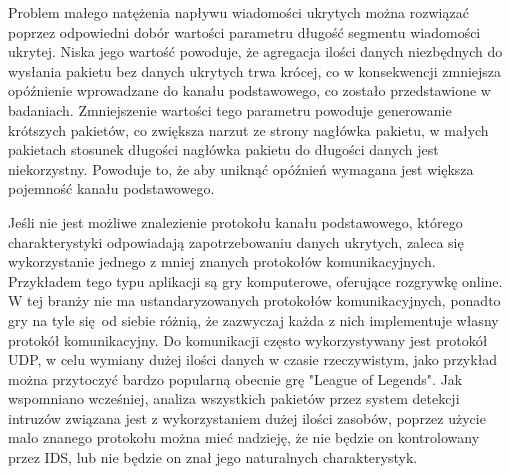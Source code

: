 \documentclass[a4paper, twoside, 12pt]{report}
\begin{document}
       Problem małego natężenia napływu wiadomości ukrytych można rozwiązać poprzez
       odpowiedni dobór wartości parametru długość segmentu wiadomości ukrytej.
       Niska jego wartość powoduje, że agregacja ilości danych niezbędnych do
       wysłania pakietu bez danych ukrytych trwa krócej, co w konsekwencji zmniejsza
       opóźnienie wprowadzane do kanału podstawowego, co zostało przedstawione w
       badaniach. Zmniejszenie wartości tego parametru powoduje generowanie
       krótszych pakietów, co zwiększa narzut ze strony nagłówka pakietu, w małych
       pakietach stosunek długości nagłówka pakietu do długości danych jest niekorzystny.
       Powoduje to, że aby uniknąć opóźnień wymagana jest większa pojemność kanału
       podstawowego.

       Jeśli nie jest możliwe znalezienie protokołu kanału podstawowego, którego
       charakterystyki odpowiadają zapotrzebowaniu danych ukrytych, zaleca się
       wykorzystanie jednego z mniej znanych protokołów komunikacyjnych. Przykładem
       tego typu aplikacji są gry komputerowe, oferujące rozgrywkę online. W tej
       branży nie ma ustandaryzowanych protokołów komunikacyjnych, ponadto gry na
       tyle się od siebie różnią, że zazwyczaj każda z nich implementuje własny
       protokół komunikacyjny. Do komunikacji często wykorzystywany jest protokół
       UDP, w celu wymiany dużej ilości danych w czasie rzeczywistym, jako przykład
       można przytoczyć bardzo popularną obecnie grę "League of Legends". Jak wspomniano
       wcześniej, analiza wszystkich pakietów przez system detekcji intruzów
       związana jest z wykorzystaniem dużej ilości zasobów, poprzez użycie mało
       znanego protokołu można mieć nadzieję, że nie będzie on kontrolowany
       przez IDS, lub nie będzie on znał jego naturalnych charakterystyk.
\end{document}
